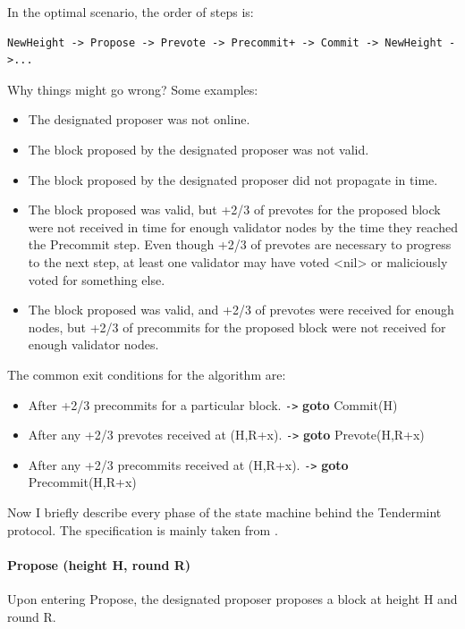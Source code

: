 \documentclass[]{article}
\newcommand{\goto}{\texttt{->} \textbf{goto}  }
\begin{document}
In the optimal scenario, the order of steps is:
\begin{verbatim}
NewHeight -> Propose -> Prevote -> Precommit+ -> Commit -> NewHeight ->...
\end{verbatim}
Why things might go wrong? Some examples:

\begin{itemize}
\item The designated proposer was not online.
\item The block proposed by the designated proposer was not valid.
\item The block proposed by the designated proposer did not propagate in time.
\item The block proposed was valid, but +2/3 of prevotes for the proposed block were not received in time for enough validator nodes by the time they reached the Precommit step. Even though +2/3 of prevotes are necessary to progress to the next step, at least one validator may have voted <nil> or maliciously voted for something else.
\item The block proposed was valid, and +2/3 of prevotes were received for enough nodes, but +2/3 of precommits for the proposed block were not received for enough validator nodes.
\end{itemize}
The common exit conditions for the algorithm are:
\begin{itemize}
\item After +2/3 precommits for a particular block. \goto Commit(H)
\item After any +2/3 prevotes received at (H,R+x). \goto Prevote(H,R+x)
\item After any +2/3 precommits received at (H,R+x). \goto  
Precommit(H,R+x)
\end{itemize}
Now I briefly describe every phase of the state machine behind the Tendermint protocol. The specification is mainly taken from \cite{tdocs}.

\paragraph{Propose (height H, round R)} Upon entering Propose, the designated proposer proposes a block at height H and round R.
\end{document}
